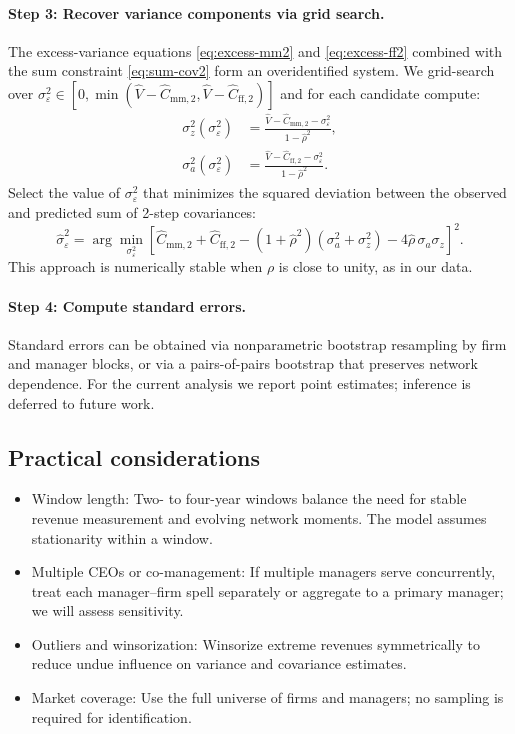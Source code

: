 \documentclass[11pt]{article}
\begin{document}
\paragraph{Step 3: Recover variance components via grid search.}
The excess-variance equations \eqref{eq:excess-mm2} and \eqref{eq:excess-ff2} combined with the sum constraint \eqref{eq:sum-cov2} form an overidentified system. We grid-search over $\sigma_\varepsilon^2 \in [0, \min(\widehat V - \widehat C_{\text{mm},2}, \widehat V - \widehat C_{\text{ff},2})]$ and for each candidate compute:
\begin{align}
 \sigma_z^2(\sigma_\varepsilon^2) &= \frac{\widehat V - \widehat C_{\text{mm},2} - \sigma_\varepsilon^2}{1 - \widehat\rho^2}, \\
 \sigma_a^2(\sigma_\varepsilon^2) &= \frac{\widehat V - \widehat C_{\text{ff},2} - \sigma_\varepsilon^2}{1 - \widehat\rho^2}.
\end{align}
Select the value of $\sigma_\varepsilon^2$ that minimizes the squared deviation between the observed and predicted sum of 2-step covariances:
\begin{equation}
 \widehat\sigma_\varepsilon^2 = \arg\min_{\sigma_\varepsilon^2} \left[\widehat C_{\text{mm},2} + \widehat C_{\text{ff},2} - (1+\widehat\rho^2)(\sigma_a^2 + \sigma_z^2) - 4\widehat\rho\,\sigma_a\sigma_z\right]^2.
\end{equation}
This approach is numerically stable when $\rho$ is close to unity, as in our data.

\paragraph{Step 4: Compute standard errors.}
Standard errors can be obtained via nonparametric bootstrap resampling by firm and manager blocks, or via a pairs-of-pairs bootstrap that preserves network dependence. For the current analysis we report point estimates; inference is deferred to future work.

\subsection{Practical considerations}
\begin{itemize}
  \item Window length: Two- to four-year windows balance the need for stable revenue measurement and evolving network moments. The model assumes stationarity within a window.
  \item Multiple CEOs or co-management: If multiple managers serve concurrently, treat each manager--firm spell separately or aggregate to a primary manager; we will assess sensitivity.
  \item Outliers and winsorization: Winsorize extreme revenues symmetrically to reduce undue influence on variance and covariance estimates.
  \item Market coverage: Use the full universe of firms and managers; no sampling is required for identification.
\end{itemize}
\end{document}
